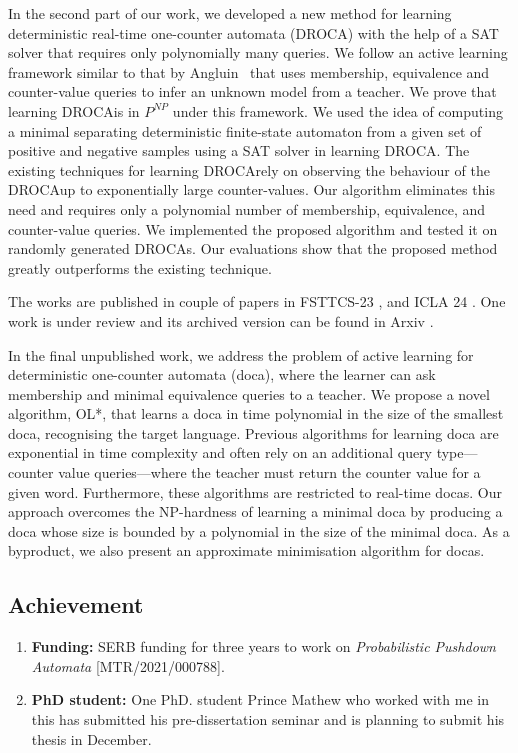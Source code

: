 \documentclass[a4paper,10pt]{article}
\theoremstyle{open}
\newcommand{\droca}{DROCA}
\newcommand{\drocas}{DROCAs}
\begin{document}
In the second part of our work, we developed a new method for learning deterministic real-time one-counter automata (\droca) with the help of a SAT solver that requires only polynomially many queries. We follow an active learning framework similar to that by Angluin~\cite{angluin} that uses membership, equivalence and counter-value queries to infer an unknown model from a teacher. We prove that learning \droca is in $P^{NP}$ under this framework.
We used the idea of computing a minimal separating deterministic finite-state automaton from a given set of positive and negative samples using a SAT solver in learning \droca. The existing techniques for learning \droca rely on observing the behaviour of the \droca up to exponentially large counter-values. Our algorithm eliminates this need and requires only a polynomial number of membership, equivalence, and counter-value queries.
We implemented the proposed algorithm and tested it on randomly generated \drocas. Our evaluations show that the proposed method greatly outperforms the existing technique.

The works are published in couple of papers in FSTTCS-23 \cite{fsttcs23}, and ICLA 24 \cite{icalp25}. One work is under review and its archived version can be found in Arxiv \cite{learning24}.

In the final unpublished work, we address the problem of active learning for deterministic one-counter automata (doca),
where the learner can ask membership and minimal equivalence queries to a teacher. We propose
a novel algorithm, OL*, that learns a doca in time polynomial in the size of the smallest doca,
recognising the target language.
Previous algorithms for learning doca are exponential in time complexity and often rely on an
additional query type—counter value queries—where the teacher must return the counter value for
a given word. Furthermore, these algorithms are restricted to real-time docas.
Our approach overcomes the NP-hardness of learning a minimal doca by producing a doca
whose size is bounded by a polynomial in the size of the minimal doca. As a byproduct, we also
present an approximate minimisation algorithm for docas.

\subsection{Achievement}
\begin{enumerate}
 \item \textbf{Funding:} SERB funding for three years to work on \emph{Probabilistic Pushdown Automata} [MTR/2021/000788].
 \item \textbf{PhD student:} One PhD. student Prince Mathew who worked with me in this has submitted his pre-dissertation seminar and is planning to submit his thesis in December.
\end{enumerate}
\end{document}
